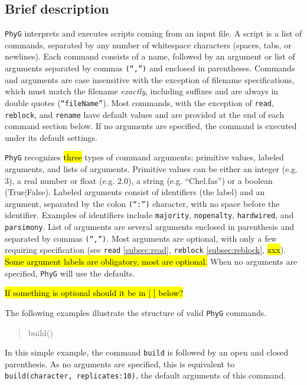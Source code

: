 \documentclass[11pt]{book}
\newcommand{\phyg}{\texttt{PhyG} }
\begin{document}
{{	\subsection{Brief description}
		\phyg interprets and executes scripts coming from an input file. A script is a list of 
		commands, separated by any number of whitespace characters (spaces, tabs, or 
		newlines). Each command consists of a name, followed by an argument or list of 
		arguments separated by commas \texttt{(``,'')} and enclosed in parentheses. 
		Commands and arguments are case insensitive with the exception of filename 
		specifications, which must match the filename \textit{exactly}, including suffixes 
		and are always in double quotes (\texttt{``fileName''}). Most commands, with the 
		exception of \texttt{read}, \texttt{reblock}, and \texttt{rename} have default values 
		and are provided at the end of each command section below. If no arguments are 
		specified, the command is executed under its default settings.
		
		\phyg recognizes \hl{three} types of command arguments: primitive values, labeled 
		arguments, and lists of arguments. Primitive values can be either an integer (e.g. 3), 
		a real number or float (e.g. 2.0), a string (e.g. ``Chel.fas'') or a boolean (True|False).
		Labeled arguments consist of identifiers (the label) and an argument, separated by
		the colon \texttt{(``:'')} character, with no space before the identifier. Examples of 
		identifiers include \texttt{majority}, \texttt{nopenalty}, \texttt{hardwired}, and 
		\texttt{parsimony}. List of arguments are several arguments enclosed in parenthesis 
		and separated by commas \texttt{(``,'')}. Most arguments are optional, with only a 
		few requiring specification (see \texttt{read} \ref{subsec:read}, \texttt{reblock} 
		\ref{subsec:reblock}, \hl{xxx}). \hl{Some argument labels are obligatory, most are 
		optional.} When no arguments are specified, \phyg will use the defaults.
		
		\hl{If something is optional should it be in [ ] below?}
		
		The following examples illustrate the structure of valid \phyg commands. 
		
				
		\begin{quote}
		build()
		\end{quote}
		
		\noindent In this simple example, the command \texttt{build} is followed by an open 
		and closed parenthesis. As no arguments are specified, this is equivalent to  
		\texttt{build(character, replicates:10)}, the default arguments of this command.
		
}}
\end{document}
